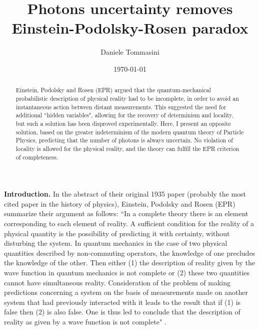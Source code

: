 \documentclass[aps,prl,showkeys,showpacs,preprint,groupedaddress,12pt]{revtex4}
\begin{document}
\title{Photons uncertainty removes Einstein-Podolsky-Rosen paradox}

\author{Daniele Tommasini}



\date{\today}

\begin{abstract}
Einstein, Podolsky and Rosen (EPR) argued that the
quantum-mechanical probabilistic description of physical reality
had to be incomplete, in order to avoid an instantaneous action
between distant measurements. This suggested the need for
additional ``hidden variables", allowing for the recovery of
determinism and locality, but such a solution has been disproved
experimentally. Here, I present an opposite solution, based on the
greater indeterminism of the modern quantum theory of Particle
Physics, predicting that the number of photons is always
uncertain. No violation of locality is allowed for the physical
reality, and the theory can fulfill the EPR criterion of
completeness.
\end{abstract}




\maketitle

{\bf Introduction.} In the abstract of their original 1935 paper
(probably the most cited paper in the history of physics),
Einstein, Podolsky and Rosen (EPR) summarize their argument as
follows: ``In a complete theory there is an element corresponding
to each element of reality. A sufficient condition for the reality
of a physical quantity is the possibility of predicting it with
certainty, without disturbing the system. In quantum mechanics in
the case of two physical quantities described by non-commuting
operators, the knowledge of one precludes the knowledge of the
other. Then either (1) the description of reality given by the
wave function in quantum mechanics is not complete or (2) these
two quantities cannot have simultaneous reality. Consideration of
the problem of making predictions concerning a system on the basis
of measurements made on another system that had previously
interacted with it leads to the result that if (1) is false then
(2) is also false. One is thus led to conclude that the
description of reality as given by a wave function is not
complete" \cite{EPR}.
\end{document}

